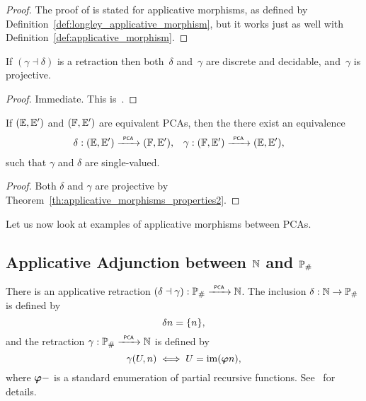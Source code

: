 \begin{proof}
  The proof of \cite[Theorem 2.5.3]{Longley:94} is stated for
  applicative morphisms, as defined by
  Definition~\ref{def:longley_applicative_morphism}, but it works just
  as well with Definition~\ref{def:applicative_morphism}.
\end{proof}

\begin{corollary}
  \label{th:corollary1_applicative_morphisms_properties}%
  If $(\gamma \dashv \delta)$ is a retraction then both~$\delta$
  and~$\gamma$ are discrete and decidable, and~$\gamma$ is projective.
\end{corollary}

\begin{proof}
  Immediate. This is~\cite[Corollary 2.5.4]{Longley:94}.
\end{proof}

\begin{corollary}
  \label{th:corollary2_applicative_morphisms_properties}%
  If $({\mathbb{E}}, {\mathbb{E}'})$ and $({\mathbb{F}}, {\mathbb{E}'})$ are equivalent PCAs, then the 
  there exist an equivalence
  \begin{align*}
    \delta &: ({\mathbb{E}}, {\mathbb{E}'}) \xrightarrow{\scriptscriptstyle\mathsf{\ PCA\ }}{} ({\mathbb{F}}, {\mathbb{E}'}),
    &
    \gamma &: ({\mathbb{F}}, {\mathbb{E}'}) \xrightarrow{\scriptscriptstyle\mathsf{\ PCA\ }}{} ({\mathbb{E}}, {\mathbb{E}'}),
  \end{align*}
  such that $\gamma$ and $\delta$ are single-valued.
\end{corollary}

\begin{proof}
  Both $\delta$ and $\gamma$ are projective by
  Theorem~\ref{th:applicative_morphisms_properties2}.
\end{proof}


Let us now look at examples of applicative morphisms between PCAs.

\subsection{Applicative Adjunction between $\mathbb{N}$ and $\mathbb{P}_{\#}$}
\label{ex:pcamorphism_K1_RE}%

%
%

There is an applicative retraction $(\delta \dashv \gamma): \mathbb{P}_{\#}
\xrightarrow{\scriptscriptstyle\mathsf{\ PCA\ }}{} \mathbb{N}$. The inclusion $\delta: \mathbb{N} \to \mathbb{P}_{\#}$ is defined
by
\begin{equation*}
  \delta n = \{n\},
\end{equation*}
and the retraction $\gamma: \mathbb{P}_{\#} \xrightarrow{\scriptscriptstyle\mathsf{\ PCA\ }}{} \mathbb{N}$ is defined by
\begin{equation*}
  \gamma(U, n)
  \iff
  U = \mathrm{im}(\text{\boldmath{$\varphi$}}{n}),
\end{equation*}
where $\text{\boldmath{$\varphi$}}{{-}}$ is a standard enumeration of partial
recursive functions. See~\cite[Proposition 3.3.7]{Longley:94} for
details.


